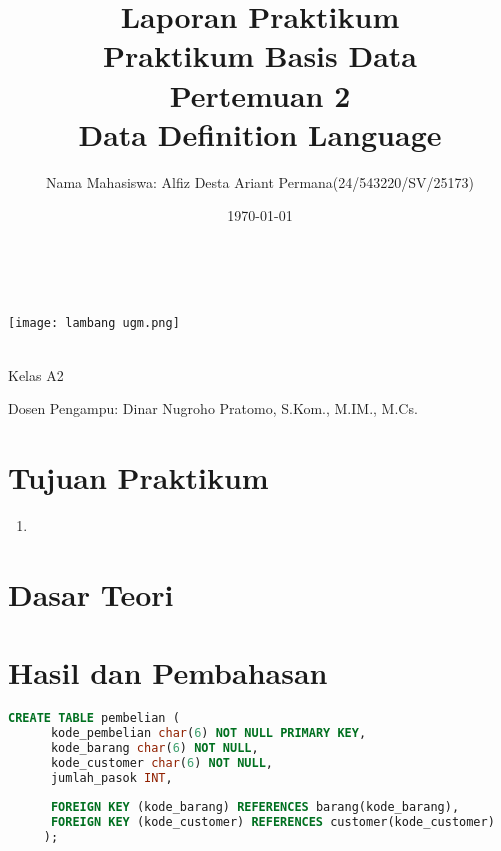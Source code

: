 \documentclass[a4paper,oneside,11pt]{book}
\title{Laporan Praktikum \\ Praktikum Basis Data\\
Pertemuan 2\\
Data Definition Language}
\author{Nama Mahasiswa: Alfiz Desta Ariant Permana(24/543220/SV/25173)}
\date{\today}
\begin{document}
\begin{titlingpage} %
\begin{center}

\vspace{4cm} %
\begin{huge} 
\textbf{\thetitle} \\
\end{huge}
\vspace{2cm}

\texttt{[image: lambang ugm.png]}\\ %
\begin{Large}
\vspace{4cm} %
\theauthor\\
Kelas A2 \\ %
\end{Large}
\begin{large}
Dosen Pengampu: Dinar Nugroho Pratomo, S.Kom., M.IM., M.Cs.\\
\end{large}


\thedate
\end{center}
\end{titlingpage}


\tableofcontents

\chapter{Tujuan Praktikum} 
\begin{enumerate}
  \item 
\end{enumerate}

\chapter{Dasar Teori}


\chapter{Hasil dan Pembahasan}
\begin{lstlisting}[language=SQL, style=sqlstyle]
    CREATE TABLE pembelian (
      kode_pembelian char(6) NOT NULL PRIMARY KEY,
      kode_barang char(6) NOT NULL,
      kode_customer char(6) NOT NULL,
      jumlah_pasok INT,
      
      FOREIGN KEY (kode_barang) REFERENCES barang(kode_barang),
      FOREIGN KEY (kode_customer) REFERENCES customer(kode_customer)
     );
    \end{lstlisting}
\end{document}
